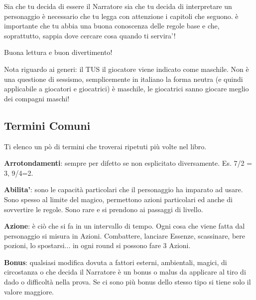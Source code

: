 \documentclass[a4paper,11pt,twoside,openany]{book}
\begin{document}
Sia che tu decida di essere il Narratore sia che tu decida di interpretare un personaggio è necessario che tu legga con attenzione i capitoli che seguono.
è importante che tu abbia una buona conoscenza delle regole base e che, soprattutto, sappia dove cercare cosa quando ti servira'!

Buona lettura e buon divertimento!
\vspace*{\fill}

\begin{note}
Nota riguardo ai generi: il TUS il giocatore viene indicato come maschile. Non è una questione di sessismo, semplicemente in italiano la forma neutra (e quindi applicabile a giocatori e giocatrici) è maschile, le giocatrici sanno giocare meglio dei compagni maschi!
\end{note}




\pagebreak{}

\subsection{Termini Comuni}

Ti elenco un pò di termini che troverai ripetuti più volte nel libro.

\textbf{Arrotondamenti}: sempre per difetto se non esplicitato diversamente. Es. 7/2 = 3, 9/4=2.

\textbf{Abilita'}: sono le capacità particolari che il personaggio ha imparato ad usare. Sono spesso al limite del magico, permettono azioni particolari ed anche di sovvertire le regole. Sono rare e si prendono ai passaggi di livello.

\textbf{Azione}: è ciò che si fa in un intervallo di tempo. Ogni cosa che viene fatta dal personaggio si misura in Azioni. Combattere, lanciare Essenze, scassinare, bere pozioni, lo spostarsi... in ogni round si possono fare 3 Azioni.

\textbf{Bonus}: qualsiasi modifica dovuta a fattori esterni, ambientali, magici, di circostanza o che decida il Narratore è un bonus o malus da applicare al tiro di dado o difficoltà nella prova. Se ci sono più bonus dello stesso tipo si tiene solo il valore maggiore.
\end{document}

